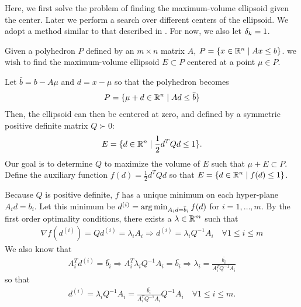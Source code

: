 \label{ellipse_optimization}

Here, we first solve the problem of finding the maximum-volume ellipsoid given the center.
Later we perform a search over different centers of the ellipsoid.
We adopt a method similar to that described in \cite{Khachiyan1993}.
For now, we also let ${\delta_k} = 1$.

Given a polyhedron $P$ defined by an $m \times n$ matrix $A$, $P = \{ x \in \mathbb R^n\; | \;  Ax \le b \}$.
we wish to find the maximum-volume ellipsoid $E \subset P$ centered at a point $\mu \in P$.

Let $\bar{b} = b - A\mu$ and $d = x - \mu$ so that the polyhedron becomes
\begin{align*}
P = \{ \mu + d \in \mathbb R^n \; | \;  Ad \le \bar{b} \}
\end{align*}
Then, the ellipsoid can then be centered at zero, and defined by a symmetric positive definite matrix $Q \succ 0$:
\begin{align*}
E = \{ d \in \mathbb R^n \; | \; \frac 1 2 d^T Q d \le 1 \}.
\end{align*}
Our goal is to determine $Q$ to maximize the volume of $E$ such that $\mu + E \subset P$.
Define the auxiliary function $f(d) = \frac 1 2 d^T Q d$ so that $E = \{ d \in \mathbb R^n\; | \; f(d) \le 1 \}$.

Because $Q$ is positive definite, $f$ has a unique minimum on each hyper-plane $A_i d = b_i$.
Let this minimum be $d^{(i)} = \operatorname*{arg\,min}_{A_id =\bar{b}_i} f(d)$ for $i=1,\ldots,m$.
By the first order optimality conditions, there exists a $\lambda \in \mathbb R^m$ such that
\begin{align*}
\nabla f(d^{(i)}) = Q d^{(i)} = \lambda_i A_i 
\Longrightarrow d^{(i)} = \lambda_i Q^{-1}A_i \quad \forall 1\le i\le m
\end{align*}
We also know that
\begin{align*}
A_i^T d^{(i)} = \bar{b_i} \Longrightarrow
A_i^T \lambda_i Q^{-1}A_i = \bar{b_i} \Longrightarrow
\lambda_i = \frac {\bar{b_i}}{A_i^T  Q^{-1}A_i}
\end{align*}
so that
\begin{align*}
d^{(i)} = \lambda_i Q^{-1}A_i = \frac {\bar{b_i}}{A_i^T  Q^{-1}A_i}  Q^{-1}A_i \quad \forall 1\le i\le m.
\end{align*}

